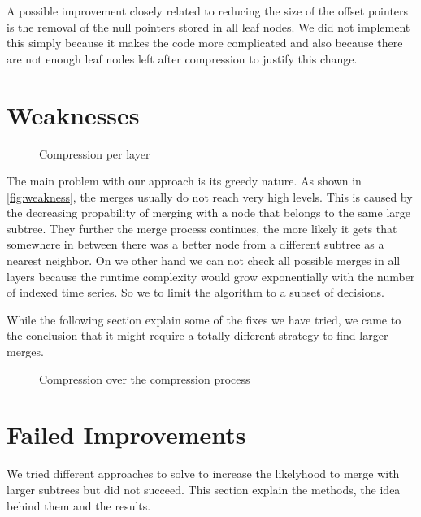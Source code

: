 A possible improvement closely related to reducing the size of the offset pointers is the removal of the null pointers stored in all leaf nodes. We did not implement this simply because it makes the code more complicated and also because there are not enough leaf nodes left after compression to justify this change.



\section{Weaknesses}
\label{sec:algorithm:weak}

\begin{figure}
    \centering
    
    \caption{Compression per layer}
    \label{fig:weakness}
\end{figure}

The main problem with our approach is its greedy nature. As shown in \autoref{fig:weakness}, the merges usually do not reach very high levels. This is caused by the decreasing propability of merging with a node that belongs to the same large subtree. They further the merge process continues, the more likely it gets that somewhere in between there was a better node from a different subtree as a nearest neighbor. On we other hand we can not check all possible merges in all layers because the runtime complexity would grow exponentially with the number of indexed time series. So we to limit the algorithm to a subset of decisions.

While the following section explain some of the fixes we have tried, we came to the conclusion that it might require a totally different strategy to find larger merges.

\begin{figure}
    \centering
    
    \caption{Compression over the compression process}
    \label{fig:compression_timeline}
\end{figure}



\section{Failed Improvements}
\label{sec:algorithm:fail}

We tried different approaches to solve to increase the likelyhood to merge with larger subtrees but did not succeed. This section explain the methods, the idea behind them and the results.


